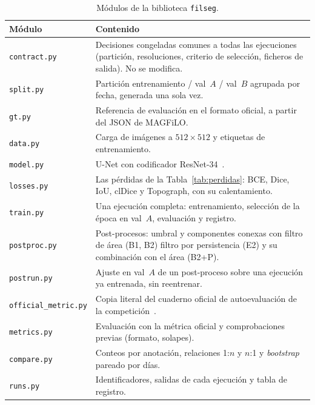 \begin{table}[ht]
\centering
\small
\begin{tabular}{@{}lp{10.5cm}@{}}
\toprule
Módulo & Contenido\\
\midrule
\texttt{contract.py} & Decisiones congeladas comunes a todas las ejecuciones (partición, resoluciones, criterio de selección, ficheros de salida). No se modifica.\\
\texttt{split.py} & Partición entrenamiento / val~$A$ / val~$B$ agrupada por fecha, generada una sola vez.\\
\texttt{gt.py} & Referencia de evaluación en el formato oficial, a partir del JSON de MAGFiLO.\\
\texttt{data.py} & Carga de imágenes a $512\times512$ y etiquetas de entrenamiento.\\
\texttt{model.py} & U-Net con codificador ResNet-34~\cite{iakubovskii2019}.\\
\texttt{losses.py} & Las pérdidas de la Tabla~\ref{tab:perdidas}: BCE, Dice, IoU, clDice y Topograph, con su calentamiento.\\
\texttt{train.py} & Una ejecución completa: entrenamiento, selección de la época en val~$A$, evaluación y registro.\\
\texttt{postproc.py} & Post-procesos: umbral y componentes conexas con filtro de área (B1, B2) filtro por persistencia (E2) y su combinación con el área (B2+P).\\
\texttt{postrun.py} & Ajuste en val~$A$ de un post-proceso sobre una ejecución ya entrenada, sin reentrenar.\\
\texttt{official\_metric.py} & Copia literal del cuaderno oficial de autoevaluación de la competición~\cite{kaggle2026}.\\
\texttt{metrics.py} & Evaluación con la métrica oficial y comprobaciones previas (formato, solapes).\\
\texttt{compare.py} & Conteos por anotación, relaciones 1:$n$ y $n$:1 y \emph{bootstrap} pareado por días.\\
\texttt{runs.py} & Identificadores, salidas de cada ejecución y tabla de registro.\\
\bottomrule
\end{tabular}
\caption{Módulos de la biblioteca \texttt{filseg}.}
\label{tab:modulos}
\end{table}

